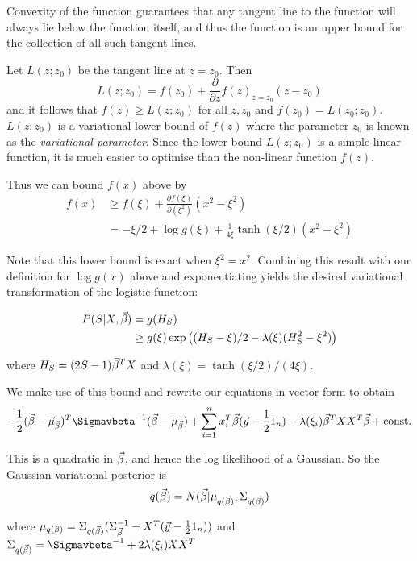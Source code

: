 \documentclass{amsart}
\begin{document}
Convexity of the function guarantees that any tangent line to the function will always lie below the
function itself, and thus the function is an upper bound for the collection of all such tangent lines.

Let $L(z;z_0)$ be the tangent line at $z = z_0$. Then
$$
L(z;z_0) = f(z_0) + \frac{\partial}{\partial z} f(z)_{z=z_0} (z - z_0)
$$
and it follows that $f(z) \geq L(z; z_0)$ for all $z, z_0$ and $f(z_0) = L(z_0; z_0)$. $L(z;z_0)$ is a
variational lower bound of $f(z)$ where the parameter $z_0$ is known as the \emph{variational parameter}.
Since the lower bound $L(z; z_0)$ is a simple linear function, it is much easier to optimise than the
non-linear function $f(z)$.

Thus we can bound $f(x)$ above by
\begin{align*}
f(x) &\geq f(\xi) + \frac{\partial f(\xi)}{\partial(\xi^2)} (x^2 - \xi^2) \\
&= -\xi/2 + \log{g(\xi)} + \frac{1}{4 \xi} \tanh{(\xi/2)}(x^2 - \xi^2)
\end{align*}

Note that this lower bound is exact when $\xi^2 = x^2$. Combining this result with our definition for
$\log{g(x)}$ above and exponentiating yields the desired variational transformation of the logistic
function:

\begin{align*}
P(S|X, \vec{\beta}) &= g(H_S) \\
&\geq g(\xi) \exp{\left( (H_S - \xi)/2 - \lambda(\xi)(H_S^2 - \xi^2) \right)}
\end{align*}

where $H_S = (2S - 1)\vec{\beta}^T X$ and $\lambda(\xi) = \tanh{(\xi/2)}/(4 \xi)$.

We make use of this bound and rewrite our equations in vector form to obtain
$$
-\half (\vbeta - \vmubeta)^T \Sigmavbeta^{-1} (\vbeta - \vmubeta) + \sum_{i=1}^n x_i^T\vbeta (\vy - \half 1_n) - \lambda(\xi_i) \vbeta^T X X^T \vbeta + \text{const.}
$$

This is a quadratic in $\vec{\beta}$, and hence the log likelihood of a Gaussian. So the Gaussian
variational posterior is
$$
	q(\vec{\beta}) = N(\vec{\beta} | \mu_{q(\vec{\beta})}, \Sigma_{q(\vec{\beta})})
$$

where $\mu_{q(\beta)} = \Sigma_{q(\vec{\beta})}(\Sigma_{\vec{\beta}}^{-1} + X^T (\vec{y} - \frac{1}{2} 1_n))$
and $\Sigma_{q(\vbeta)} = \Sigmavbeta^{-1} + 2 \lambda(\xi_i) X X^T$
\end{document}
